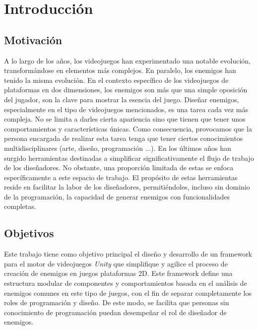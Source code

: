 \chapter{Introducción}
\label{cap:introduccion}


\section{Motivación}
A lo largo de los años, los videojuegos han experimentado una notable evolución, transformándose en elementos más complejos. En paralelo, los enemigos han tenido la misma evolución. En el contexto específico de los videojuegos de plataformas en dos dimensiones, los enemigos son más que una simple oposición del jugador, son la clave para mostrar la esencia del juego. Diseñar enemigos, especialmente en el tipo de videojuegos mencionados, es una tarea cada vez más compleja. No se limita a darles cierta apariencia sino que tienen que tener unos comportamientos y características únicas. Como consecuencia, provocamos que la persona encargada de realizar esta tarea tenga que tener ciertos conocimientos multidisciplinares (arte, diseño, programación ...). 
En los últimos años han surgido herramientas destinadas a simplificar significativamente el flujo de trabajo de los diseñadores. No obstante, una proporción limitada de estas se enfoca específicamente a este espacio de trabajo. El propósito de estas herramientas reside en facilitar la labor de los diseñadores, permitiéndoles, incluso sin dominio de la programación, la capacidad de generar enemigos con funcionalidades completas.

\section{Objetivos}
Este trabajo tiene como objetivo principal el diseño y desarrollo de un framework para el motor de videojuegos \textit{Unity} que simplifique y agilice el proceso de creación de enemigos en juegos plataformas 2D. Este framework define una estructura modular de componentes y comportamientos basada en el análisis de enemigos comunes en este tipo de juegos, con el fin de separar completamente los roles de programación y diseño. De este modo, se facilita que personas sin conocimiento de programación puedan desempeñar el rol de diseñador de enemigos.\\

